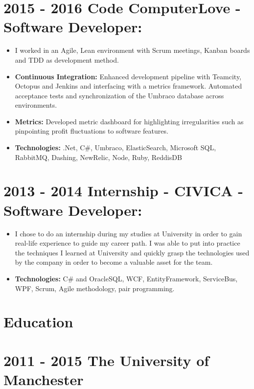 \documentclass[12pt,a4paper]{res}
\begin{document}
\begin{resume}
\section{\bf 2015 - 2016 \hspace{0.3mm} Code ComputerLove - Software Developer:}
\vspace{5mm}    
	\begin{itemize}
	\item[] I worked in an Agile, Lean environment with Scrum meetings, Kanban boards and TDD as development method.
	\item \textbf{Continuous Integration:} Enhanced development pipeline with Teamcity, Octopus and Jenkins and interfacing with a metrics framework. Automated acceptance tests and synchronization of the Umbraco database across environments.
	\item \textbf{Metrics:} Developed metric dashboard for highlighting irregularities such as pinpointing profit fluctuations to software features.
	\item \textbf{Technologies:} .Net, C\#, Umbraco, ElasticSearch, Microsoft SQL, RabbitMQ, Dashing, NewRelic, Node, Ruby, ReddisDB
	\end{itemize}
	
\section{\bf 2013 - 2014 \hspace{0.5mm} Internship - CIVICA - Software Developer:}
\vspace{5mm}    
	\begin{itemize}
	\item[] I chose to do an internship during my studies at University in order to gain real-life experience to guide my career path. I was able to put into practice the techniques I learned at University and quickly grasp the technologies used by the company in order to become a valuable asset for the team.
	\item{\bf Technologies:} C\# and OracleSQL, WCF, EntityFramework, ServiceBus, WPF, Scrum, Agile methodology, pair programming.
	\end{itemize}


\section{\large\bf Education}
\vspace{5mm}

\section{\bf 2011 - 2015 \hspace{1.5mm}The University of Manchester}
  

\end{resume}
\end{document}
